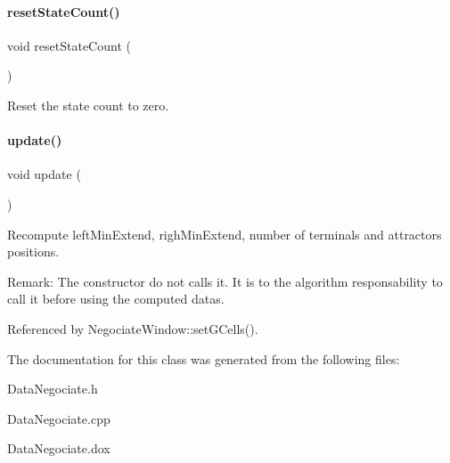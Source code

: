 \paragraph{\texorpdfstring{reset\+State\+Count()}{resetStateCount()}}
{\footnotesize\ttfamily void reset\+State\+Count (\begin{DoxyParamCaption}{ }\end{DoxyParamCaption})\hspace{0.3cm}{\ttfamily [inline]}}

Reset the state count to zero. \mbox{\label{classKite_1_1DataNegociate_ac5c54df7ed3b930268c8d7752c101725}} 
\paragraph{\texorpdfstring{update()}{update()}}
{\footnotesize\ttfamily void update (\begin{DoxyParamCaption}{ }\end{DoxyParamCaption})}

Recompute {\ttfamily left\+Min\+Extend}, {\ttfamily righ\+Min\+Extend}, number of terminals and attractors positions.

\begin{DoxyParagraph}{Remark\+: The constructor do not calls it. It is to the algorithm responsability}
to call it before using the computed datas. 
\end{DoxyParagraph}


Referenced by Negociate\+Window\+::set\+G\+Cells().



The documentation for this class was generated from the following files\+:\begin{DoxyCompactItemize}
\item 
Data\+Negociate.\+h\item 
Data\+Negociate.\+cpp\item 
Data\+Negociate.\+dox\end{DoxyCompactItemize}
